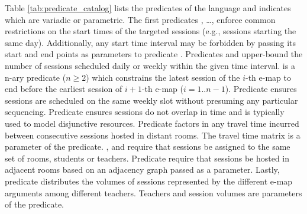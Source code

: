 Table \ref{tab:predicate_catalog} lists the predicates of the language
and indicates which are variadic or parametric.
The first predicates 
\texttt{\SAMEDAILYSLOT},
\ldots,
\texttt{\SAMESLOT}
enforce common restrictions on the start times of the targeted sessions (e.g., sessions starting the same day).
Additionally,
any start time interval may be forbidden 
by passing its start and end points 
as parameters to 
predicate \texttt{\FORBIDDENPERIOD}.
Predicates \texttt{\ATMOSTDAILY}
and
\texttt{\ATMOSTWEEKLY}
upper-bound
the number of sessions
scheduled daily or weekly
within the given time interval.
\texttt{\SEQUENCED}
is a n-ary predicate ($n\geq2$)
which constrains
the latest session of the $i$-th e-map 
to end before
the earliest session of $i+1$-th e-map ($i=1..n-1$).
Predicate 
\texttt{\WEEKLY}
ensures sessions
are scheduled %
on the same weekly slot
without presuming any particular sequencing.
Predicate
\texttt{\NOOVERLAP}
ensures sessions do not overlap in time
and is typically used to model disjunctive resources.
Predicate \texttt{\TRAVEL}
factors in any travel time
incurred between consecutive sessions
hosted in distant rooms.
The travel time matrix is a parameter of the predicate.
\texttt{\SAMEROOMS},
\texttt{\SAMESTUDENTS}
and
\texttt{\SAMETEACHERS}
require that sessions be assigned to the same set of rooms,
students or teachers.
Predicate 
\texttt{\ADJACENTROOMS}
require that sessions be hosted in 
adjacent rooms 
based on an adjacency graph passed as a parameter.
Lastly, 
predicate \texttt{\TEACHERDISTRIBUTION}
distributes the volumes of sessions represented by the different e-map arguments 
among different teachers. Teachers and session volumes are parameters of the predicate.

